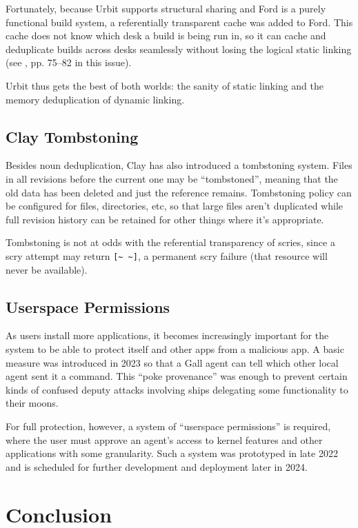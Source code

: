 \documentclass[twoside]{article}
\begin{document}
Fortunately, because Urbit supports structural sharing and Ford is a purely functional build system, a referentially transparent cache was added to Ford.  This cache does not know which desk a build is being run in, so it can cache and deduplicate builds across desks seamlessly without losing the logical static linking (see \citet{Blackman2024}, pp. 75–82 in this issue).

Urbit thus gets the best of both worlds: the sanity of static linking and the memory deduplication of dynamic linking.

\subsection{Clay Tombstoning}

Besides noun deduplication, Clay has also introduced a tombstoning system.  Files in all revisions before the current one may be ``tombstoned'', meaning that the old data has been deleted and just the reference remains.  Tombstoning policy can be configured for files, directories, etc, so that large files aren't duplicated while full revision history can be retained for other things where it's appropriate.

Tombstoning is not at odds with the referential transparency of scries, since a scry attempt may return \lstinline[style=inlinecode]{[~ ~]}, a permanent scry failure (that resource will never be available).

\subsection{Userspace Permissions}

As users install more applications, it becomes increasingly important for the system to be able to protect itself and other apps from a malicious app.  A basic measure was introduced in 2023 so that a Gall agent can tell which other local agent sent it a command.  This ``poke provenance'' was enough to prevent certain kinds of confused deputy attacks involving ships delegating some functionality to their moons.

For full protection, however, a system of ``userspace permissions'' is required, where the user must approve an agent's access to kernel features and other applications with some granularity.  Such a system was prototyped in late 2022 and is scheduled for further development and deployment later in 2024.

\section{Conclusion}
\end{document}

